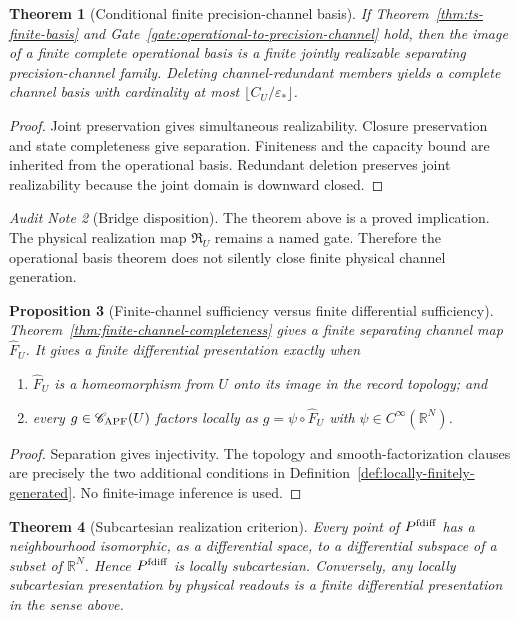 \documentclass[11pt]{article}
\newtheorem{theorem}{Theorem}[section]
\newtheorem{proposition}[theorem]{Proposition}
\theoremstyle{remark}
\newtheorem{audit}[theorem]{Audit Note}
\newcommand{\floor}{\varepsilon_*}
\begin{document}
\begin{theorem}[Conditional finite precision-channel basis]
\label{thm:conditional-finite-channel-basis}
If Theorem~\ref{thm:ts-finite-basis} and
Gate~\ref{gate:operational-to-precision-channel} hold, then the image of a
finite complete operational basis is a finite jointly realizable separating
precision-channel family.  Deleting channel-redundant members yields a complete
channel basis with cardinality at most
$\lfloor C_U/\floor\rfloor$.
\end{theorem}
\begin{proof}
Joint preservation gives simultaneous realizability.  Closure preservation and
state completeness give separation.  Finiteness and the capacity bound are
inherited from the operational basis.  Redundant deletion preserves joint
realizability because the joint domain is downward closed.
\end{proof}

\begin{audit}[Bridge disposition]
The theorem above is a proved implication.  The physical realization map
$\mathfrak R_U$ remains a named gate.  Therefore the operational basis theorem
does not silently close finite physical channel generation.
\end{audit}

\begin{proposition}[Finite-channel sufficiency versus finite differential sufficiency]
\label{prop:finite-sufficiency-split}
Theorem~\ref{thm:finite-channel-completeness} gives a finite separating channel
map $\widehat F_U$.  It gives a finite differential presentation exactly when
\begin{enumerate}[label=(\roman*)]
\item $\widehat F_U$ is a homeomorphism from $U$ onto its image in the record
topology; and
\item every $g\in\mathscr C_{\rm APF}(U)$ factors locally as
$g=\psi\circ\widehat F_U$ with $\psi\in C^\infty(\mathbb R^N)$.
\end{enumerate}
\end{proposition}

\begin{proof}
Separation gives injectivity.  The topology and smooth-factorization clauses
are precisely the two additional conditions in
Definition~\ref{def:locally-finitely-generated}.  No finite-image inference is
used.
\end{proof}

\begin{theorem}[Subcartesian realization criterion]
\label{cor:subcartesian-realization}
Every point of $P^{\rm fdiff}$ has a neighbourhood isomorphic, as a
differential space, to a differential subspace of a subset of
$\mathbb R^N$.  Hence $P^{\rm fdiff}$ is locally subcartesian.  Conversely,
any locally subcartesian presentation by physical readouts is a finite
differential presentation in the sense above.
\end{theorem}
\end{document}
